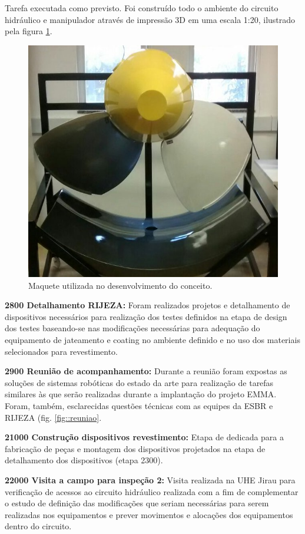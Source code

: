 Tarefa executada como previsto. Foi construído todo o ambiente do circuito
hidráulico e manipulador através de impressão 3D em uma escala 1:20, ilustrado
pela figura \ref{fig::maquete}.

\begin{figure}[h!]
\centering
\label{fig::maquete}
\includegraphics[width=0.6\columnwidth]{figs/maquete}
\caption{Maquete utilizada no desenvolvimento do conceito.}
\end{figure} 

  
\noindent
\textbf{2800 Detalhamento RIJEZA:} Foram realizados projetos e detalhamento de
dispositivos necessários para realização dos testes definidos na etapa de
design dos testes baseando-se nas modificações necessárias para adequação do
equipamento de jateamento e coating no ambiente definido e no uso dos materiais
selecionados para revestimento.

\noindent
\textbf{2900 Reunião de acompanhamento:} Durante a reunião foram expostas as
soluções de sistemas robóticas do estado da arte para realização de tarefas
similares às que serão realizadas durante a implantação	do projeto EMMA. Foram,
também, esclarecidas questões técnicas com as equipes da ESBR e RIJEZA (fig.
\ref{fig::reuniao}.

\noindent
\textbf{21000 Construção dispositivos revestimento:} Etapa de dedicada para a
fabricação de peças e montagem dos dispositivos projetados na etapa de
detalhamento dos dispositivos (etapa 2300).


\noindent
\textbf{22000 Visita a campo para inspeção 2:} Visita realizada na UHE Jirau
para verificação de acessos ao circuito hidráulico realizada com a fim de
complementar o estudo de definição das modificações que seriam necessárias para
serem realizadas nos equipamentos e prever movimentos e alocações dos
equipamentos dentro do circuito.


